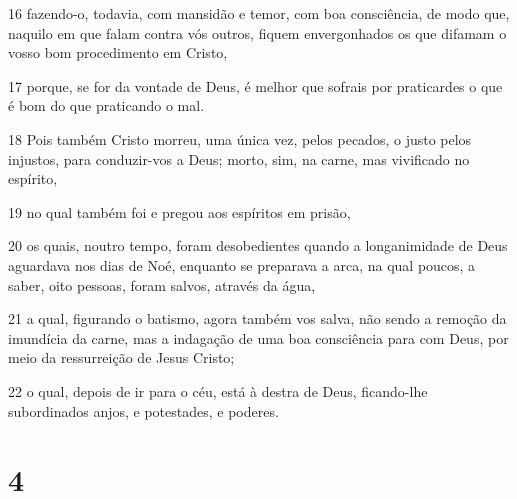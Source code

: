 \par 16 fazendo-o, todavia, com mansidão e temor, com boa consciência, de modo que, naquilo em que falam contra vós outros, fiquem envergonhados os que difamam o vosso bom procedimento em Cristo,
\par 17 porque, se for da vontade de Deus, é melhor que sofrais por praticardes o que é bom do que praticando o mal.
\par 18 Pois também Cristo morreu, uma única vez, pelos pecados, o justo pelos injustos, para conduzir-vos a Deus; morto, sim, na carne, mas vivificado no espírito,
\par 19 no qual também foi e pregou aos espíritos em prisão,
\par 20 os quais, noutro tempo, foram desobedientes quando a longanimidade de Deus aguardava nos dias de Noé, enquanto se preparava a arca, na qual poucos, a saber, oito pessoas, foram salvos, através da água,
\par 21 a qual, figurando o batismo, agora também vos salva, não sendo a remoção da imundícia da carne, mas a indagação de uma boa consciência para com Deus, por meio da ressurreição de Jesus Cristo;
\par 22 o qual, depois de ir para o céu, está à destra de Deus, ficando-lhe subordinados anjos, e potestades, e poderes.

\chapter{4}

